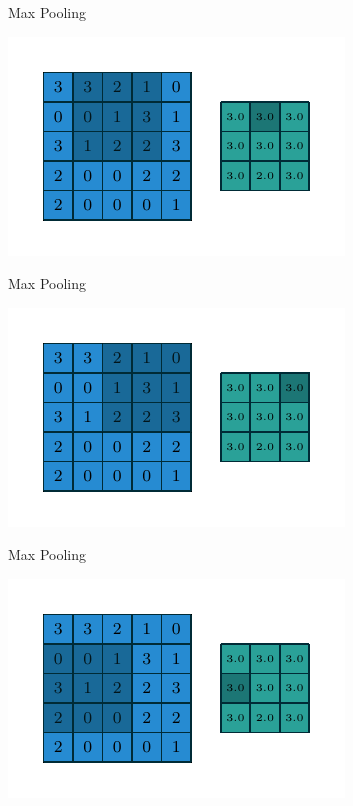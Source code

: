 \documentclass[10pt]{beamer}
\begin{document}
\begin{frame}{Max Pooling}
\begin{center}
\includegraphics[scale=1.5]{images/numerical_max_pooling_01.pdf}
\end{center}
\end{frame}

\begin{frame}{Max Pooling}
\begin{center}
\includegraphics[scale=1.5]{images/numerical_max_pooling_02.pdf}
\end{center}
\end{frame}

\begin{frame}{Max Pooling}
\begin{center}
\includegraphics[scale=1.5]{images/numerical_max_pooling_03.pdf}
\end{center}
\end{frame}
\end{document}

